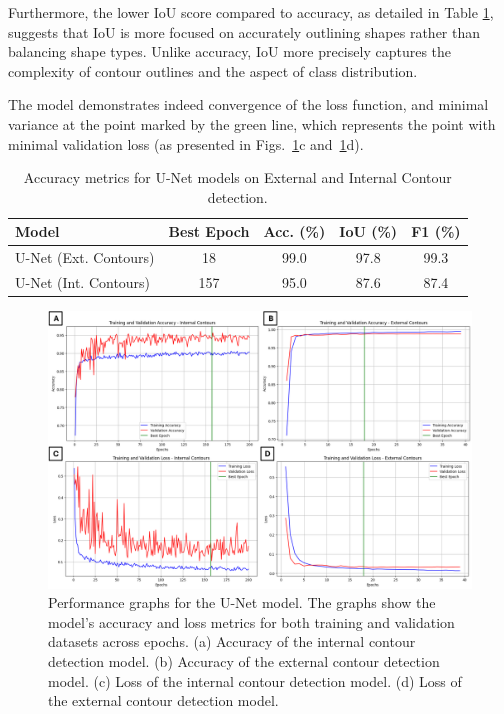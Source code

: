 \documentclass{ieeeaccess}
\begin{document}
Furthermore, the lower IoU score compared to accuracy, as detailed in Table \ref{tab:unet_performance}, suggests that IoU is more focused on accurately outlining shapes rather than balancing shape types. Unlike accuracy, IoU more precisely captures the complexity of contour outlines and the aspect of class distribution.

The model demonstrates indeed convergence of the loss function, and minimal variance at the point marked by the green line, which represents the point with minimal validation loss (as presented in Figs.~\ref{fig:model_performance_graphs}c and~\ref{fig:model_performance_graphs}d).

\begin{table}[ht]
\centering
\begin{tabular}{lcccc}
\hline
Model & Best Epoch & Acc. (\%) & IoU (\%) & F1 (\%)\\ \hline
U-Net (Ext. Contours) & 18 & 99.0 & 97.8 & 99.3 \\
U-Net (Int. Contours) & 157 & 95.0 & 87.6 & 87.4 \\ \hline
\end{tabular}
\caption{Accuracy metrics for U-Net models on External and Internal Contour detection.}
\label{tab:unet_performance}
\end{table}



\begin{figure}[!t]
    \centering
    \begin{adjustbox}{max width=0.8\linewidth, max height=0.8\textheight}
        \includegraphics{figures/model_performance_graphs.png}
    \end{adjustbox}
    \caption{Performance graphs for the U-Net model. The graphs show the model's accuracy and loss metrics for both training and validation datasets across epochs. (a) Accuracy of the internal contour detection model. (b) Accuracy of the external contour detection model. (c) Loss of the internal contour detection model. (d) Loss of the external contour detection model.}
    \label{fig:model_performance_graphs}
\end{figure}
\end{document}
